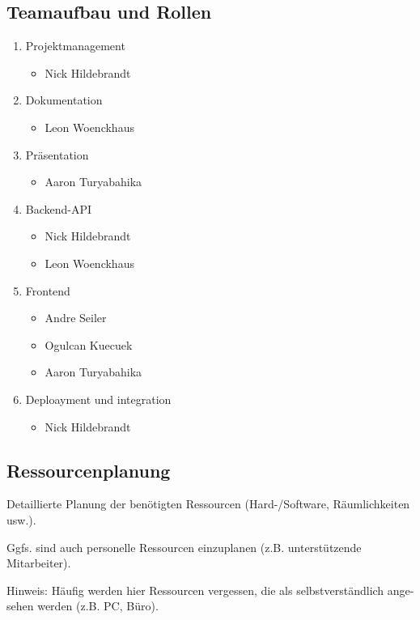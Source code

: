\documentclass[a4paper,12pt]{article}
\begin{document}
\subsection{Teamaufbau und Rollen}
\begin{enumerate}
    \item Projektmanagement
    \begin{itemize}
        \item Nick Hildebrandt
    \end{itemize}
    \item Dokumentation
    \begin{itemize}
    	\item Leon Woenckhaus
    \end{itemize}
    \item Präsentation
    \begin{itemize}
    	\item Aaron Turyabahika
    \end{itemize}
    \item Backend-API
    \begin{itemize}
        \item Nick Hildebrandt
        \item Leon Woenckhaus
    \end{itemize}
    \item Frontend
    \begin{itemize}
        \item Andre Seiler
        \item Ogulcan Kuecuek
    	\item Aaron Turyabahika
    \end{itemize}
    \item Deploayment und integration
    \begin{itemize}
        \item Nick Hildebrandt
    \end{itemize}
\end{enumerate}

\subsection{Ressourcenplanung}
Detaillierte Planung der benötigten Ressourcen
(Hard-/Software, Räumlichkeiten usw.).

Ggfs. sind auch personelle Ressourcen einzuplanen (z.B. unterstützende
Mitarbeiter).

Hinweis: Häufig werden hier Ressourcen vergessen, die als selbstverständlich
ange- sehen werden (z.B. PC, Büro).
\end{document}

